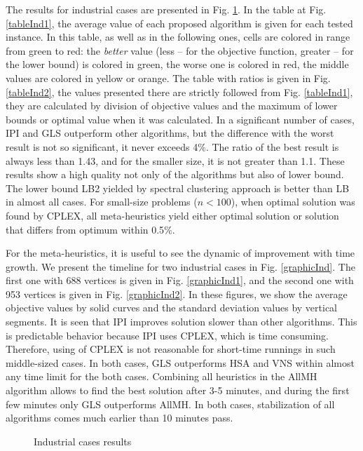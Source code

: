 \documentclass[runningheads]{llncs}
\begin{document}
The results for industrial cases are presented in Fig. \ref{tableInd}. In the table at Fig. \ref{tableInd1}, the average value of each proposed algorithm is given for each tested instance. In this table, as well as in the following ones, cells are colored in range from green to red: the \emph{better} value (less -- for the objective function, greater -- for the lower bound) is colored in green, the worse one is colored in red, the middle values are colored in yellow or orange. The table with ratios is given in Fig. \ref{tableInd2}, the values presented there are strictly followed from Fig. \ref{tableInd1}, they are calculated by division of objective values and the maximum of lower bounds or optimal value when it was calculated. In a significant number of cases, IPI and GLS outperform other algorithms, but the difference with the worst result is not so significant, it never exceeds 4$\%$. The ratio of the best result is always less than 1.43, and for the smaller size, it is not greater than 1.1. These results show a high quality not only of the algorithms but also of lower bound. The lower bound LB2 yielded by spectral clustering approach is better than LB in almost all cases. For small-size problems ($n < 100$), when optimal solution was found by CPLEX, all meta-heuristics yield either optimal solution or solution that differs from optimum within 0.5$\%$.

For the meta-heuristics, it is useful to see the dynamic of improvement with time growth. We present the timeline for two industrial cases in Fig. \ref{graphicInd}. The first one with 688 vertices is given in Fig. \ref{graphicInd1}, and the second one with 953 vertices is given in Fig. \ref{graphicInd2}. In these figures, we show the average objective values by solid curves and the standard deviation values by vertical segments. It is seen that IPI improves solution slower than other algorithms. This is predictable behavior because IPI uses CPLEX, which is time consuming. Therefore, using of CPLEX is not reasonable for short-time runnings in such middle-sized cases. In both cases, GLS outperforms HSA and VNS within almost any time limit for the both cases. Combining all heuristics in the AllMH algorithm allows to find the best solution after 3-5 minutes, and during the first few minutes only GLS outperforms AllMH. In both cases, stabilization of all algorithms comes much earlier than 10 minutes pass.

\begin{figure}[!hbtp]
\centering
{} \hfill
{} \hfill
\caption{Industrial cases results} \label{tableInd}
\end{figure}
\end{document}

